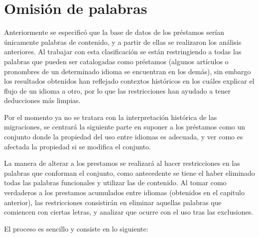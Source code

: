 \chapter{Omisión de palabras}

Anteriormente se especificó que la base de datos de los préstamos serían únicamente palabras de contenido, y a partir de ellas se realizaron los análisis anteriores.  Al trabajar con esta clasificación se están restringiendo a todas las palabras que pueden ser catalogadas como préstamos (algunos artículos o pronombres de un determinado idioma se encuentran en los demás), sin embargo los resultados obtenidos han reflejado contextos históricos en los cuáles explicar el flujo de un idioma a otro, por lo que las restricciones han ayudado a tener deducciones más limpias. 

Por el momento ya no se tratara con la interpretación histórica de las migraciones, se centrará la siguiente parte en suponer a los préstamos como un conjunto donde la propiedad del uso entre idiomas es adecuada, y ver como es afectada la propiedad si se modifica el conjunto. 

La manera de alterar a los prestamos se realizará al hacer restricciones en las palabras que conforman el conjunto, como antecedente se tiene el haber eliminado todas las palabras funcionales  y utilizar las de contenido.  Al tomar como verdaderos a los prestamos acumulados entre idiomas (obtenidos en el capitulo anterior), las restricciones consistirán en eliminar aquellas palabras que comiencen con ciertas letras,  y analizar que ocurre con el uso tras las exclusiones. 

\hfill\break

El proceso es sencillo y consiste en lo siguiente:
 


